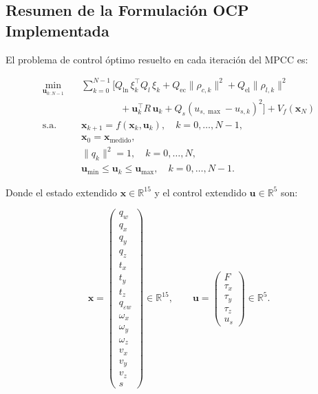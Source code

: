 \documentclass[11pt,a4paper]{article}
\begin{document}
\subsection{Resumen de la Formulación OCP Implementada}
\label{subsec:ocp_summary}

El problema de control óptimo resuelto en cada iteración del MPCC es:

\begin{equation}
\boxed{
\begin{aligned}
\min_{\mathbf{u}_{0:N-1}} \quad & \sum_{k=0}^{N-1} \Big[
    Q_{\text{ln}} \, \xi_k^\top Q_l \, \xi_k 
    + Q_{\text{ec}} \|\rho_{c,k}\|^2 
    + Q_{\text{el}} \|\rho_{l,k}\|^2 \\
    & \qquad\qquad + \mathbf{u}_k^\top R \, \mathbf{u}_k
    + Q_s (u_{s,\max} - u_{s,k})^2
\Big] + V_f(\mathbf{x}_N) \\
\text{s.a.} \quad 
& \mathbf{x}_{k+1} = f(\mathbf{x}_k, \mathbf{u}_k), \quad k = 0,\ldots,N-1, \\
& \mathbf{x}_0 = \mathbf{x}_{\text{medido}}, \\
& \|q_k\|^2 = 1, \quad k = 0,\ldots,N, \\
& \mathbf{u}_{\min} \leq \mathbf{u}_k \leq \mathbf{u}_{\max}, \quad k = 0,\ldots,N-1.
\end{aligned}
}
\end{equation}

Donde el estado extendido $\mathbf{x} \in \mathbb{R}^{15}$ y el control extendido $\mathbf{u} \in \mathbb{R}^5$ son:

\begin{equation}
\mathbf{x} = \begin{pmatrix}
q_w \\ q_x \\ q_y \\ q_z \\ t_x \\ t_y \\ t_z \\ q_{\varepsilon w} \\
\omega_x \\ \omega_y \\ \omega_z \\
v_x \\ v_y \\ v_z \\
s
\end{pmatrix} \in \mathbb{R}^{15}, \qquad
\mathbf{u} = \begin{pmatrix}
F \\ \tau_x \\ \tau_y \\ \tau_z \\ u_s
\end{pmatrix} \in \mathbb{R}^5.
\end{equation}
\end{document}
